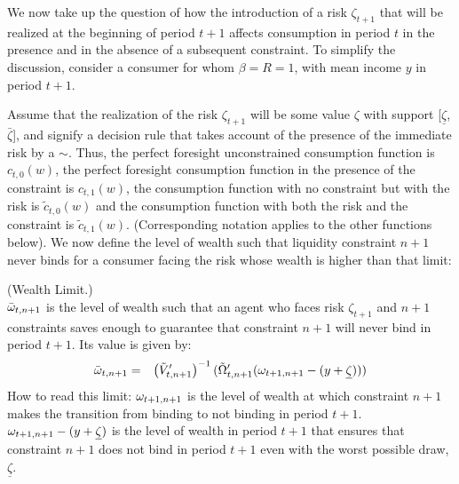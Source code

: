 We now take up the question of how the introduction of a risk $\zeta_{t+1}$ that will be realized at the beginning of period $t+1$ affects consumption in period $t$ in the presence and in the absence of a subsequent constraint.  To simplify the discussion, consider a consumer for whom $\beta=R=1$, with mean income ${y}$ in period $t+1$.

Assume that the realization of the risk $\zeta_{t+1}$ will be some value $\zeta$ with support [$\underline{\zeta}$,$\bar{\zeta}$], and signify a decision rule that takes account of the presence of the immediate risk by a $\sim$.  Thus, the perfect foresight unconstrained consumption function is $c_{t,0}(w)$, the perfect foresight consumption function in the presence of the constraint is $c_{t,1}(w)$, the consumption function with no constraint but with the risk is $\tilde{c}_{t,0}(w)$ and the consumption function with both the risk and the constraint is $\tilde{c}_{t,1}(w)$.  (Corresponding notation applies to the other functions below). We now define the level of wealth such that liquidity constraint $n+1$ never binds for a consumer facing the risk whose wealth is higher than that limit:

\begin{defn}(Wealth Limit.)\\
	${\bar{\omega}}_{t,n+1}$ is the level of wealth such that an agent who faces risk $\zeta_{t+1}$ and $n+1$ constraints saves enough to guarantee that constraint $n+1$ will never bind in period $t+1$.  Its value is given by:
	\begin{eqnarray}
	{\bar{\omega}}_{t,n+1} & = & \left(\tilde{V}_{t,n+1}'\right)^{-1}(\tilde{\Omega}_{t,n+1}^{\prime}(\omega_{t+1,n+1}-({y}+\underline{\zeta}))) \label{eq:tildeomegabar}
	\end{eqnarray}
	How to read this limit: $\omega_{t+1,n+1}$ is the level of wealth at which constraint $n+1$ makes the transition from binding to not binding in period $t+1$. $\omega_{t+1,n+1} - ({y} + \underline{\zeta})$ is the level of wealth in period $t+1$ that ensures that constraint $n+1$ does not bind in period $t+1$ even with the worst possible draw, $\underline{\zeta}$.
      \end{defn}

